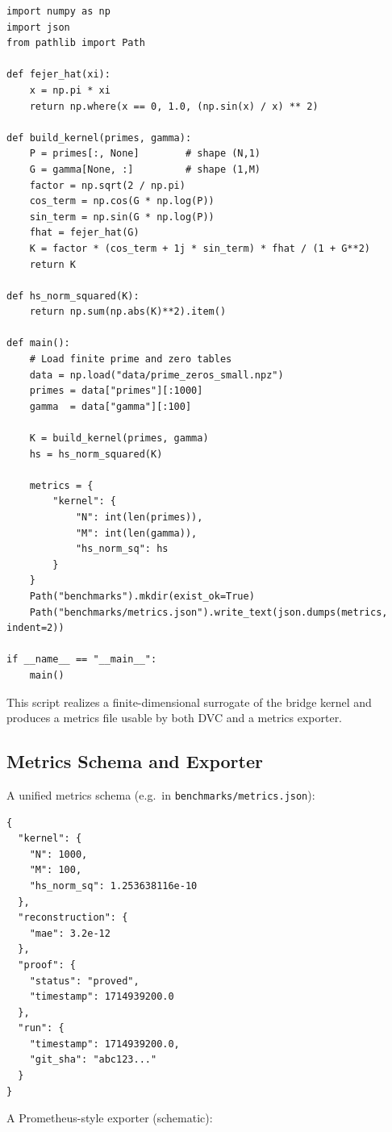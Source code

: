 \documentclass[11pt]{article}
\begin{document}
\begin{verbatim}
import numpy as np
import json
from pathlib import Path

def fejer_hat(xi):
    x = np.pi * xi
    return np.where(x == 0, 1.0, (np.sin(x) / x) ** 2)

def build_kernel(primes, gamma):
    P = primes[:, None]        # shape (N,1)
    G = gamma[None, :]         # shape (1,M)
    factor = np.sqrt(2 / np.pi)
    cos_term = np.cos(G * np.log(P))
    sin_term = np.sin(G * np.log(P))
    fhat = fejer_hat(G)
    K = factor * (cos_term + 1j * sin_term) * fhat / (1 + G**2)
    return K

def hs_norm_squared(K):
    return np.sum(np.abs(K)**2).item()

def main():
    # Load finite prime and zero tables
    data = np.load("data/prime_zeros_small.npz")
    primes = data["primes"][:1000]
    gamma  = data["gamma"][:100]

    K = build_kernel(primes, gamma)
    hs = hs_norm_squared(K)

    metrics = {
        "kernel": {
            "N": int(len(primes)),
            "M": int(len(gamma)),
            "hs_norm_sq": hs
        }
    }
    Path("benchmarks").mkdir(exist_ok=True)
    Path("benchmarks/metrics.json").write_text(json.dumps(metrics, indent=2))

if __name__ == "__main__":
    main()
\end{verbatim}

This script realizes a finite-dimensional surrogate of the bridge kernel and produces a metrics file usable by both DVC and a metrics exporter.

\subsection{Metrics Schema and Exporter}

A unified metrics schema (e.g.\ in \texttt{benchmarks/metrics.json}):

\begin{verbatim}
{
  "kernel": {
    "N": 1000,
    "M": 100,
    "hs_norm_sq": 1.253638116e-10
  },
  "reconstruction": {
    "mae": 3.2e-12
  },
  "proof": {
    "status": "proved",
    "timestamp": 1714939200.0
  },
  "run": {
    "timestamp": 1714939200.0,
    "git_sha": "abc123..."
  }
}
\end{verbatim}

A Prometheus-style exporter (schematic):
\end{document}
